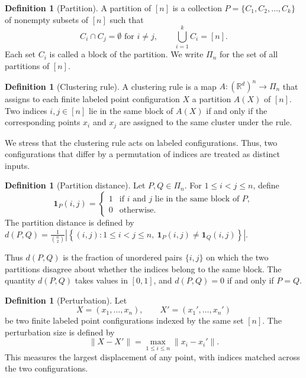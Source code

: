 \documentclass[11pt]{amsart}
\theoremstyle{plain}
\theoremstyle{definition}
\newtheorem{definition}[subsection]{Definition}
\begin{document}
\begin{definition}[Partition]
A partition of $[n]$ is a collection
$P = \{C_1, C_2, \ldots, C_k\}$
of nonempty subsets of $[n]$ such that
\[
C_i \cap C_j = \emptyset \text{ for } i \ne j, 
\qquad \bigcup_{i=1}^k C_i = [n].
\]
Each set $C_i$ is called a block of the partition. We write $\Pi_n$ for the set of all partitions of $[n]$.
\end{definition}

\begin{definition}[Clustering rule]
A clustering rule is a map
$A : (\mathbb{R}^d)^n \to \Pi_n$
that assigns to each finite labeled point configuration $X$ a partition $A(X)$ of $[n]$. Two indices $i,j \in [n]$ lie in the same block of $A(X)$ if and only if the corresponding points $x_i$ and $x_j$ are assigned to the same cluster under the rule.
\end{definition}

We stress that the clustering rule acts on labeled configurations. Thus, two configurations that differ by a permutation of indices are treated as distinct inputs.

\begin{definition}[Partition distance]
Let $P,Q \in \Pi_n$. For $1 \le i < j \le n$, define
\[
\mathbf{1}_P(i,j) =
\begin{cases}
1 & \text{if } i \text{ and } j \text{ lie in the same block of } P, \\
0 & \text{otherwise.}
\end{cases}
\]
The partition distance is defined by
$d(P,Q) = \frac{1}{\binom{n}{2}} 
\left| \left\{ (i,j) : 1 \le i < j \le n,\ \mathbf{1}_P(i,j) \ne \mathbf{1}_Q(i,j) \right\} \right|.$

Thus $d(P,Q)$ is the fraction of unordered pairs $\{i,j\}$ on which the two partitions disagree about whether the indices belong to the same block. The quantity $d(P,Q)$ takes values in $[0,1]$, and $d(P,Q)=0$ if and only if $P=Q$.
\end{definition}

\begin{definition}[Perturbation]
Let
\[
X = (x_1,\ldots,x_n), \qquad X' = (x_1',\ldots,x_n')
\]
be two finite labeled point configurations indexed by the same set $[n]$. The perturbation size is defined by
\[
\|X - X'\| = \max_{1 \le i \le n} \|x_i - x_i'\|.
\]
This measures the largest displacement of any point, with indices matched across the two configurations.
\end{definition}
\end{document}

